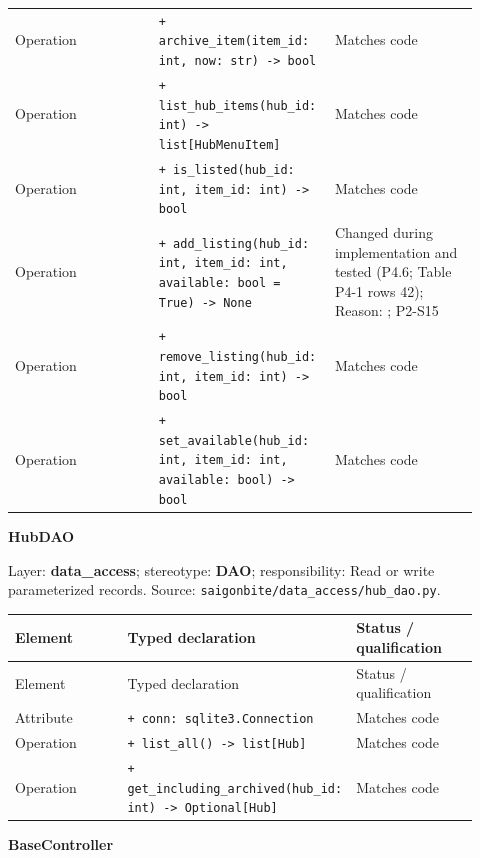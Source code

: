 \begin{longtable}{>{\raggedright\arraybackslash}p{0.3067\linewidth}>{\raggedright\arraybackslash}p{0.3067\linewidth}>{\raggedright\arraybackslash}p{0.3067\linewidth}}
Operation & \texttt{+ archive\_\allowbreak{}item(item\_\allowbreak{}id: int, now: str) -\textgreater{} bool} & Matches code \\
Operation & \texttt{+ list\_\allowbreak{}hub\_\allowbreak{}items(hub\_\allowbreak{}id: int) -\textgreater{} list[HubMenuItem]} & Matches code \\
Operation & \texttt{+ is\_\allowbreak{}listed(hub\_\allowbreak{}id: int, item\_\allowbreak{}id: int) -\textgreater{} bool} & Matches code \\
Operation & \texttt{+ add\_\allowbreak{}listing(hub\_\allowbreak{}id: int, item\_\allowbreak{}id: int, available: bool = True) -\textgreater{} None } & Changed during implementation and tested (P4.6; Table P4-1 rows 42); Reason: ; P2-S15 \\
Operation & \texttt{+ remove\_\allowbreak{}listing(hub\_\allowbreak{}id: int, item\_\allowbreak{}id: int) -\textgreater{} bool} & Matches code \\
Operation & \texttt{+ set\_\allowbreak{}available(hub\_\allowbreak{}id: int, item\_\allowbreak{}id: int, available: bool) -\textgreater{} bool} & Matches code \\
\end{longtable}
\textbf{HubDAO}

Layer: \textbf{data\_access}; stereotype: \textbf{\guillemotleft{}DAO\guillemotright{}}; responsibility: Read or write parameterized records. Source: \texttt{saigonbite/\allowbreak{}data\_\allowbreak{}access/\allowbreak{}hub\_\allowbreak{}dao.\allowbreak{}py}.

\begin{longtable}{>{\raggedright\arraybackslash}p{0.3067\linewidth}>{\raggedright\arraybackslash}p{0.3067\linewidth}>{\raggedright\arraybackslash}p{0.3067\linewidth}}
Element & Typed declaration & Status / qualification \\
\hline\endfirsthead
Element & Typed declaration & Status / qualification \\
\hline\endhead
Attribute & \texttt{+ conn: sqlite3.\allowbreak{}Connection} & Matches code \\
Operation & \texttt{+ list\_\allowbreak{}all() -\textgreater{} list[Hub]} & Matches code \\
Operation & \texttt{+ get\_\allowbreak{}including\_\allowbreak{}archived(hub\_\allowbreak{}id: int) -\textgreater{} Optional[Hub]} & Matches code \\
\end{longtable}
\textbf{BaseController}

